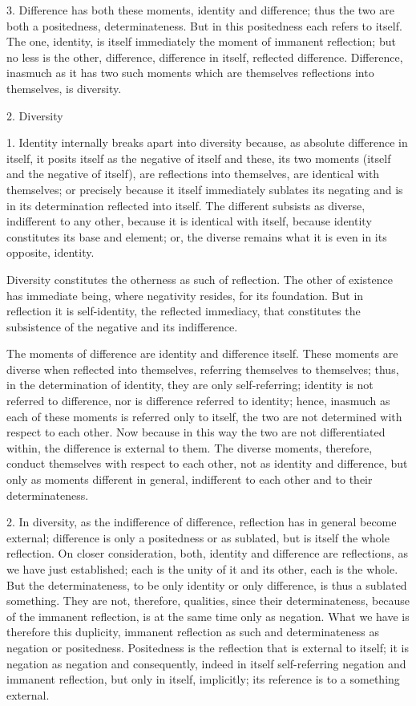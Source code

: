 3. Difference has both these moments,
identity and difference;
thus the two are both a positedness, determinateness.
But in this positedness each refers to itself.
The one, identity, is itself immediately
the moment of immanent reflection;
but no less is the other, difference,
difference in itself, reflected difference.
Difference, inasmuch as it has two such moments
which are themselves reflections into themselves,
is diversity.

2. Diversity

1. Identity internally breaks apart into diversity
because, as absolute difference in itself,
it posits itself as the negative of itself
and these, its two moments
(itself and the negative of itself),
are reflections into themselves,
are identical with themselves;
or precisely because it itself
immediately sublates its negating
and is in its determination reflected into itself.
The different subsists as diverse,
indifferent to any other,
because it is identical with itself,
because identity constitutes its base and element;
or, the diverse remains what it is
even in its opposite, identity.

Diversity constitutes the otherness
as such of reflection.
The other of existence has immediate being,
where negativity resides, for its foundation.
But in reflection it is self-identity,
the reflected immediacy, that constitutes
the subsistence of the negative and its indifference.

The moments of difference are identity and difference itself.
These moments are diverse when reflected into themselves,
referring themselves to themselves;
thus, in the determination of identity,
they are only self-referring;
identity is not referred to difference,
nor is difference referred to identity;
hence, inasmuch as each of these moments is
referred only to itself, the two
are not determined
with respect to each other.
Now because in this way the two are not differentiated within,
the difference is external to them.
The diverse moments, therefore,
conduct themselves with respect to each other,
not as identity and difference,
but only as moments different in general,
indifferent to each other and to their determinateness.

2. In diversity, as the indifference of difference,
reflection has in general become external;
difference is only a positedness or as sublated,
but is itself the whole reflection.
On closer consideration, both, identity and difference
are reflections, as we have just established;
each is the unity of it and its other,
each is the whole.
But the determinateness,
to be only identity or only difference,
is thus a sublated something.
They are not, therefore, qualities,
since their determinateness,
because of the immanent reflection,
is at the same time only as negation.
What we have is therefore this duplicity,
immanent reflection as such
and determinateness as negation or positedness.
Positedness is the reflection that is external to itself;
it is negation as negation
and consequently, indeed in itself
self-referring negation and immanent reflection,
but only in itself, implicitly;
its reference is to a something external.

